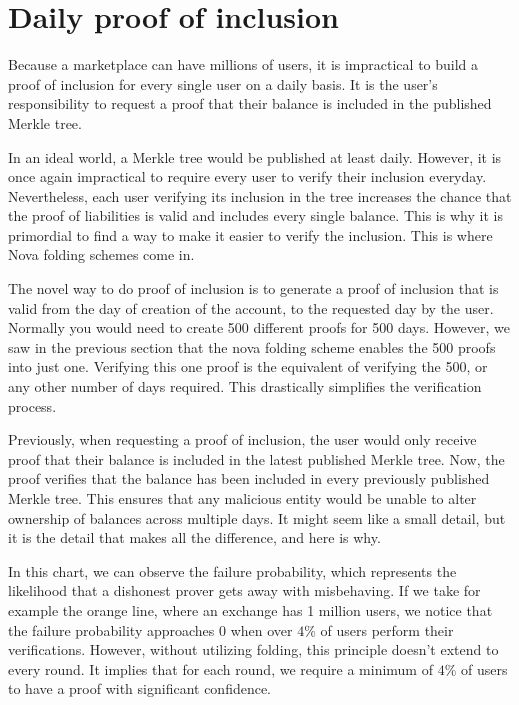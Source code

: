 
\section{Daily proof of inclusion}

Because a marketplace can have millions of users, it is impractical to build a proof of inclusion for every single user on a daily basis.
It is the user's responsibility to request a proof that their balance is included in the published Merkle tree.

In an ideal world, a Merkle tree would be published at least daily. However, it is once again impractical to require every user to verify their inclusion everyday.
Nevertheless, each user verifying its inclusion in the tree increases the chance that the proof of liabilities is valid and includes every single balance.
This is why it is primordial to find a way to make it easier to verify the inclusion. This is where Nova folding schemes come in.

The novel way to do proof of inclusion is to generate a proof of inclusion that is valid from the day of creation of the account, to the requested day by the user.
Normally you would need to create 500 different proofs for 500 days. However, we saw in the previous section that the nova folding scheme enables the 500 proofs into just one.
Verifying this one proof is the equivalent of verifying the 500, or any other number of days required.
This drastically simplifies the verification process.

Previously, when requesting a proof of inclusion, the user would only receive proof that their balance is included in the latest published Merkle tree. Now, the proof verifies that the balance has been included in every previously published Merkle tree.
This ensures that any malicious entity would be unable to alter ownership of balances across multiple days. It might seem like a small detail, but it is the detail that makes all the difference, and here is why.

In this chart, we can observe the failure probability, which represents the likelihood that a dishonest prover gets away with misbehaving.
If we take for example the orange line, where an exchange has 1 million users, we notice that the failure probability approaches 0 when over $4\%$ of users perform their verifications.
However, without utilizing folding, this principle doesn't extend to every round. It implies that for each round, we require a minimum of $4\%$ of users to have a proof with significant confidence.

